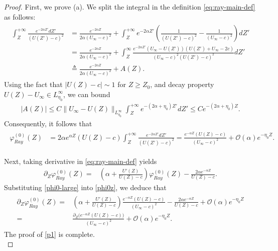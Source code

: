 \documentclass[reqno,11pt]{amsart}
\numberwithin{equation}{section}
\numberwithin{equation}{section}
\theoremstyle{plain}
\begin{document}
\begin{proof} First, we prove (a). We split the integral in the definition \eqref{eq:ray-main-def} as follows:
	\begin{align}\label{kernel-large}\begin{aligned}
			\int_{Z}^{+\infty}\frac{e^{-2\alpha Z'}dZ'}{(U(Z')-c)^2}&=\frac{e^{-2\alpha Z}}{2\alpha(U_{\infty}-c)^2}+\int_{Z}^{+\infty}e^{-2\alpha Z'}\left(\frac{1}{(U(Z')-c)^2}-\frac{1}{(U_\infty-c)^2}
			\right)dZ'\\
			&=\frac{e^{-2\alpha Z}}{2\alpha(U_{\infty}-c)^2}+\int_Z^\infty\frac{e^{-2\alpha Z'}(U_\infty-U(Z'))(U(Z')+U_\infty-2c)}{(U_\infty-c)^2(U(Z')-c)^2}d Z'\\
			&\triangleq\frac{e^{-2\alpha Z}}{2\alpha(U_{\infty}-c)^2}+A(Z).
	\end{aligned}\end{align}
	Using the fact that $
		 |U(Z)-c|\sim 1$  for $Z\geq Z_0$,	and decay property $U(Z)-U_{\infty}\in L^\infty_{\eta_0}$, we can bound
	\begin{align}
		|A(Z)|\leq  C\|U_\infty-U(Z)\|_{L^\infty_{\eta_0}}\int_{Z}^{+\infty}e^{-(2\alpha+\eta_0)Z'}dZ'
		\leq Ce^{-(2\alpha+\eta_0) Z}.\label{A}
	\end{align}
	Consequently, it follows that 
	\begin{align}\label{phi0-large}
		\begin{aligned}
			\varphi_{Ray}^{(0)}(Z)&=2\alpha e^{\alpha Z}(U(Z)-c)\int_{Z}^{+\infty}\frac{e^{-2\alpha Z'}dZ'}{(U(Z')-c)^2}
			=\frac{e^{-\alpha Z}(U(Z)-c)}{(U_\infty-c)^2}+\mathcal{O}(\alpha) e^{-\eta_0 Z}.
	\end{aligned}\end{align}
	
	Next, taking derivative in \eqref{eq:ray-main-def} yields
	\begin{align}\label{phi0z}
		\partial_Z\varphi_{Ray}^{(0)}(Z)= & (\alpha+\frac{U'(Z)}{U(Z)-c})\varphi_{Ray}^{(0)}(Z)-\frac{2\alpha e^{-\alpha Z}}{U(Z)-c}.
	\end{align}
	Substituting \eqref{phi0-large} into \eqref{phi0z}, we deduce that
	\begin{align}\begin{aligned}
			\partial_Z\varphi_{Ray}^{(0)}(Z)= & \left(\alpha+\frac{U'(Z)}{U(Z)-c}\right)\frac{e^{-\alpha Z}(U(Z)-c)}{(U_\infty-c)^2}-\frac{2\alpha e^{-\alpha Z}}{U(Z)-c}+\mathcal{O}(\alpha) e^{-\eta_0 Z} \\
			=& \frac{\partial_Z\big(e^{-\alpha Z}(U(Z)-c)\big)}{(U_\infty-c)^2}+\mathcal{O}(\alpha) e^{-\eta_0 Z}.\nonumber
	\end{aligned}\end{align}
	The proof of \eqref{p1} is complete.\\
	

\end{proof}
\end{document}
